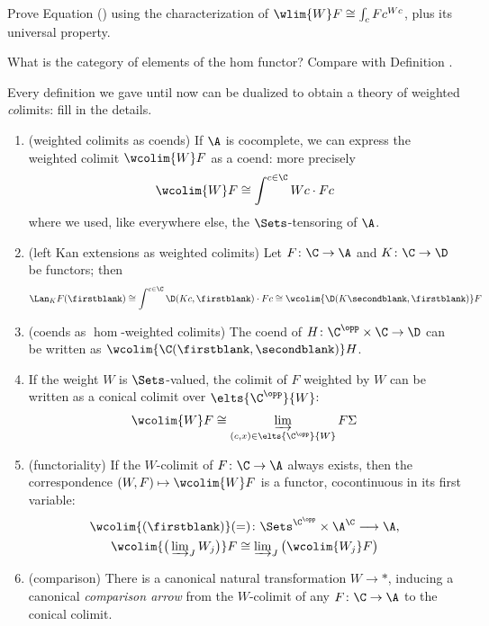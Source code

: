 \begin{exerciseset}
\begin{exercisepoints}
\item Prove Equation () using the characterization of $\wlim{W}F\cong \int_c Fc^{Wc}$, plus its universal property.
\item What is the category of elements of the hom functor? Compare with Definition .
\item \label{ex4:wcolims} Every definition we gave until now can be dualized to obtain a theory of weighted \emph{co}limits: fill in the details.
\begin{enumerate}[label=$\roman*$)]
	\item (weighted colimits as coends) If $\A$ is cocomplete, we can express the weighted colimit $\wcolim{W}F$ as a coend: more precisely
	\[
	\wcolim{W}F\cong \int^{c\in\C} Wc\cdot Fc
	\] 
	where we used, like everywhere else, the $\Sets$-tensoring of $\A$.
	\item (left Kan extensions as weighted colimits) Let $F\colon \C\to \A$ and $K\colon \C\to \D$ be functors; then 
	\[
	\Lan_KF(\firstblank)\cong \int^{c\in\C} \D(Kc,\firstblank)\cdot Fc\cong \wcolim{\D(K\secondblank,\firstblank)}F
	\]
	\item (coends as $\hom$-weighted colimits) The coend of $H\colon \C^\opp\times\C\to \D$ can be written as  $\wcolim{\C(\firstblank,\secondblank)}H$.
	\item If the weight $W$ is $\Sets$-valued, the colimit of $F$ weighted by $W$ can be written as a conical colimit over $\elts{\C^\opp}{W}$: 
	\[
	 \wcolim{W}F\cong \varinjlim_{(c,x)\in \elts{\C^\opp}{W}}F\Sigma
	\]
	\item (functoriality) If the $W$-colimit of $F\colon\C\to\A$ always exists, then the correspondence $(W,F)\mapsto \wcolim{W}F$ is a functor, cocontinuous in its first variable:
	\begin{gather}
	\wcolim{(\firstblank)}(=)\colon \Sets^{\C^\opp} \times \A^\C\longrightarrow \A, \notag \\
	\textstyle 
	\wcolim{\big(\varinjlim_J W_j\big)}F\cong \varinjlim_J \big(\wcolim{W_j}F\big)
	\end{gather}
	\item (comparison) There is a canonical natural transformation $W\to *$, inducing a canonical \emph{comparison arrow} from the $W$-colimit of any $F\colon \C\to \A$ to the conical colimit.
\end{enumerate}

\end{exercisepoints}
\end{exerciseset}
